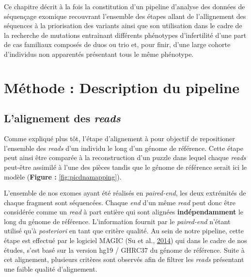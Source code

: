 \documentclass[12pt,twoside]{reedthesis}
\theoremstyle{definition}
\theoremstyle{definition}
\theoremstyle{remark}
\begin{document}
  Ce chapitre décrit à la fois la constitution d'un pipeline d'analyse des
  données de séquençage exomique recouvrant l'ensemble des étapes allant
  de l'allignement des séquences à la priorisation des variants ainsi que
  son utilisation dans le cadre de la recherche de mutations entrainant
  différents phénotypes d'infertilité d'une part de cas familiaux composés
  de duos ou trio et, pour finir, d'une large cohorte d'individus non
  apparentés présentant tous le même phénotype.
  
  \newpage
  
  \section{Méthode : Description du
  pipeline}\label{methode-description-du-pipeline}
  
  \subsection{\texorpdfstring{L'alignement des
  \emph{reads}}{L'alignement des reads}}\label{lalignement-des-reads}
  
  Comme expliqué plus tôt, l'étape d'alignement à pour objectif de
  repositioner l'ensemble des \emph{reads} d'un individu le long d'un
  génome de référence. Cette étape peut ainsi être comparée à la
  reconstruction d'un puzzle dans lequel chaque \emph{reads} peut-être
  assimilé à l'une des pièces tandis que le génome de référence serait ici
  le modèle (\textbf{Figure : }\ref{fig:picdnamapping}).
  
  L'ensemble de nos exomes ayant été réalisés en \emph{paired-end}, les
  deux extrémités de chaque fragment sont séquencées. Chaque \emph{end}
  d'un même \emph{read} peut donc être considérée comme un \emph{read} à
  part entière qui sont alignées \textbf{indépendamment} le long du génome
  de référence. L'information fournit par le \emph{paired-end} n'étant
  utilisé qu'à \emph{posteriori} en tant que critère qualité. Au sein de
  notre pipeline, cette étape est effectué par le logiciel MAGIC (Su et
  al., \protect\hyperlink{ref-Su2014}{2014}) qui dans le cadre de nos
  études, s'est basé sur la version hg19 / GHRC37 du génome de référence.
  Suite à cet alignement, plusieurs critères sont observés afin de filtrer
  les \emph{reads} présentant une faible qualité d'alignement.
  
\end{document}
